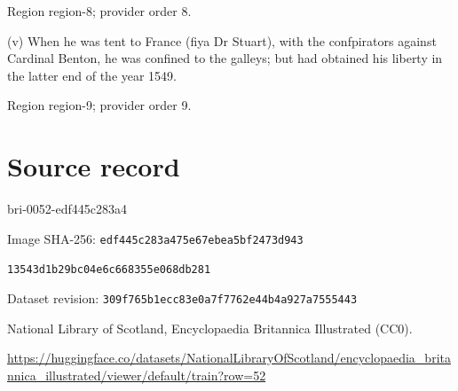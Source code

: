 \documentclass[11pt]{article}
\begin{document}
{\scriptsize\color{gray} Region region-8; provider order 8.\par}
\medskip

(v) When he was tent to France (fiya Dr Stuart), with the confpirators against Cardinal Benton, he was confined to the galleys; but had obtained his liberty in the latter end of the year 1549.
\par

{\scriptsize\color{gray} Region region-9; provider order 9.\par}
\medskip
\newpage\section*{Source record}
bri-0052-edf445c283a4\par
Image SHA-256: \texttt{edf445c283a475e67ebea5bf2473d943}\par\texttt{13543d1b29bc04e6c668355e068db281}\par
Dataset revision: \texttt{309f765b1ecc83e0a7f7}\texttt{762e44b4a927a7555443}\par
National Library of Scotland, Encyclopaedia Britannica Illustrated (CC0).\par
\url{https://huggingface.co/datasets/NationalLibraryOfScotland/encyclopaedia_britannica_illustrated/viewer/default/train?row=52}
\end{document}
